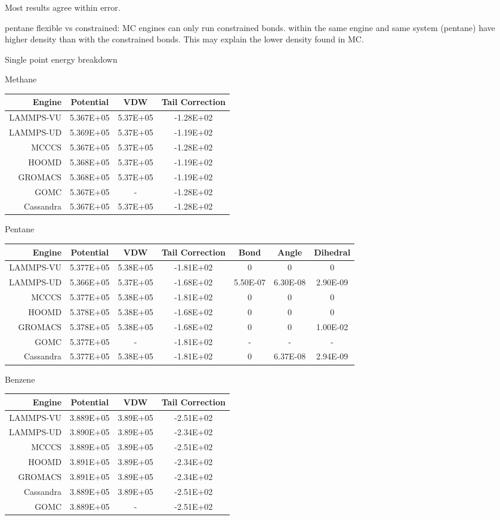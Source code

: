 Most results agree within error.

pentane flexible vs constrained: MC engines can only run constrained bonds. within the same engine and same system (pentane) have higher density than with the constrained bonds. This may explain the lower density found in MC.

Single point energy breakdown

Methane
\begin{table}[]
\begin{tabular}{rccc}
Engine & Potential & VDW & Tail Correction \\ \hline
LAMMPS-VU & 5.367E+05 & 5.37E+05 & -1.28E+02 \\
LAMMPS-UD & 5.369E+05 & 5.37E+05 & -1.19E+02 \\
MCCCS & 5.367E+05 & 5.37E+05 & -1.28E+02 \\
HOOMD & 5.368E+05 & 5.37E+05 & -1.19E+02 \\
GROMACS & 5.368E+05 & 5.37E+05 & -1.19E+02 \\
GOMC & 5.367E+05 & - & -1.28E+02 \\
Cassandra & 5.367E+05 & 5.37E+05 & -1.28E+02
\end{tabular}
\end{table}

Pentane
\begin{table}[]
\begin{tabular}{rcccccc}
Engine & Potential & VDW & Tail Correction & Bond & Angle & Dihedral \\ \hline
LAMMPS-VU & 5.377E+05 & 5.38E+05 & -1.81E+02 & 0 & 0 & 0 \\
LAMMPS-UD & 5.366E+05 & 5.37E+05 & -1.68E+02 & 5.50E-07 & 6.30E-08 & 2.90E-09 \\
MCCCS & 5.377E+05 & 5.38E+05 & -1.81E+02 & 0 & 0 & 0 \\
HOOMD & 5.378E+05 & 5.38E+05 & -1.68E+02 & 0 & 0 & 0 \\
GROMACS & 5.378E+05 & 5.38E+05 & -1.68E+02 & 0 & 0 & 1.00E-02 \\
GOMC & 5.377E+05 & - & -1.81E+02 & - & - & - \\
Cassandra & 5.377E+05 & 5.38E+05 & -1.81E+02 & 0 & 6.37E-08 & 2.94E-09
\end{tabular}
\end{table}

Benzene
\begin{table}[]
\begin{tabular}{rccc}
Engine & Potential & VDW & Tail Correction \\ \hline
LAMMPS-VU & 3.889E+05 & 3.89E+05 & -2.51E+02 \\
LAMMPS-UD & 3.890E+05 & 3.89E+05 & -2.34E+02 \\
MCCCS & 3.889E+05 & 3.89E+05 & -2.51E+02 \\
HOOMD & 3.891E+05 & 3.89E+05 & -2.34E+02 \\
GROMACS & 3.891E+05 & 3.89E+05 & -2.34E+02 \\
Cassandra & 3.889E+05 & 3.89E+05 & -2.51E+02 \\
GOMC & 3.889E+05 & - & -2.51E+02
\end{tabular}
\end{table}

